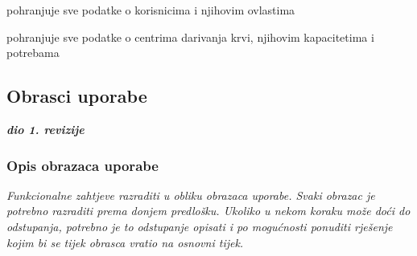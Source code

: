 \begin{packed_enum}
\begin{packed_enum}
				\end{packed_enum}
    
                    \item  {}
    
                    \begin{packed_enum}
					
					\item pohranjuje sve podatke o korisnicima i njihovim ovlastima
					\item pohranjuje sve podatke o centrima darivanja krvi, njihovim kapacitetima i potrebama
					
				\end{packed_enum}
			\end{packed_enum}
			
			\eject 
			
			
				
			\subsection{Obrasci uporabe}
				
				\textbf{\textit{dio 1. revizije}}
				
				\subsubsection{Opis obrazaca uporabe}
					\textit{Funkcionalne zahtjeve razraditi u obliku obrazaca uporabe. Svaki obrazac je potrebno razraditi prema donjem predlošku. Ukoliko u nekom koraku može doći do odstupanja, potrebno je to odstupanje opisati i po mogućnosti ponuditi rješenje kojim bi se tijek obrasca vratio na osnovni tijek.}\\
					


